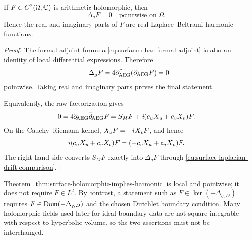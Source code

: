 \begin{theorem}
\label{thm:surface-holomorphic-implies-harmonic}
If $F\in C^2(\Omega;\mathbb{C})$ is arithmetic holomorphic, then
\begin{equation}\label{eq:surface-holomorphic-harmonic-equation}
 \Delta_gF=0
 \quad\text{pointwise on }\Omega.
\end{equation}
Hence the real and imaginary parts of $F$ are real
Laplace--Beltrami harmonic functions.
\end{theorem}

\begin{proof}
The formal-adjoint formula
\eqref{eq:surface-dbar-formal-adjoint} is also an identity of local
differential expressions.  Therefore
\[
 -\Delta_gF
 =4\overline\partial_{\!\mathrm{AEG}}^*(\overline\partial_{\!\mathrm{AEG}} F)=0
\]
pointwise.  Taking real and imaginary parts proves the final statement.

Equivalently, the raw factorization gives
\[
 0=4\partial_{\!\mathrm{AEG}}\overline\partial_{\!\mathrm{AEG}} F
   =S_MF+i(c_uX_u+c_vX_v)F.
\]
On the Cauchy--Riemann kernel, $X_u F=-iX_v F$, and hence
\[
 i(c_uX_u+c_vX_v)F
 =(-c_vX_u+c_uX_v)F.
\]
The right-hand side converts $S_MF$ exactly into $\Delta_gF$ through
\eqref{eq:surface-laplacian-drift-comparison}.
\end{proof}

\begin{remark}
\label{rem:surface-local-versus-l2-kernel}
Theorem~\ref{thm:surface-holomorphic-implies-harmonic} is local and pointwise;
it does not require $F\in L^2$.  By contrast, a statement such as
$F\in\ker(-\Delta_{g,D})$ requires
$F\in\operatorname{Dom}(-\Delta_{g,D})$ and the
chosen Dirichlet boundary condition.  Many holomorphic fields used later for
ideal-boundary data are not square-integrable with respect to hyperbolic volume,
so the two assertions must not be interchanged.
\end{remark}
